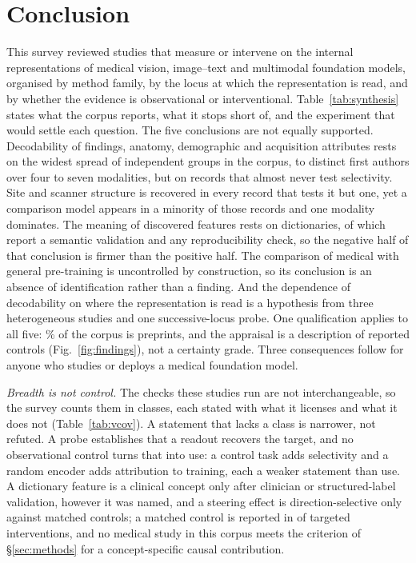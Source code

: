\section{Conclusion}
\label{sec:conclusion}

This survey reviewed \Ncore{} studies that measure or intervene on the internal representations of
medical vision, image--text and multimodal foundation models, organised by method family, by the locus
at which the representation is read, and by whether the evidence is observational or interventional.
Table~\ref{tab:synthesis} states what the corpus reports, what it stops short of, and the experiment
that would settle each question. The five conclusions are not equally supported. Decodability of
findings, anatomy, demographic and acquisition attributes rests on the widest spread of independent
groups in the corpus, \Fdecgrpmin{} to \Fdecgrpmax{} distinct first authors over four to seven
modalities, but on records that almost never test selectivity. Site and scanner structure is recovered
in every record that tests it but one, yet a comparison model appears in a minority of those records
and one modality dominates. The meaning of discovered features rests on \Nsae{} dictionaries, of which
\Nsaeval{} report a semantic validation and \Nsaestab{} any reproducibility check, so the negative half
of that conclusion is firmer than the positive half. The comparison of medical with general
pre-training is uncontrolled by construction, so its conclusion is an absence of identification rather
than a finding. And the dependence of decodability on where the representation is read is a hypothesis
from three heterogeneous studies and one successive-locus probe. One qualification applies to all five:
\Pctpreprint\% of the corpus is preprints, and the appraisal is a description of reported controls
(Fig.~\ref{fig:findings}), not a certainty grade. Three consequences follow for anyone who studies or
deploys a medical foundation model.

\emph{Breadth is not control.} The checks these studies run are not interchangeable, so the survey
counts them in \Vnclasses{} classes, each stated with what it licenses and what it does not
(Table~\ref{tab:vcov}). A statement that lacks a class is narrower, not refuted. A probe establishes
that a readout recovers the target, and no observational control turns that into use: a control task
adds selectivity and a random encoder adds attribution to training, each a weaker statement than use. A
dictionary feature is a clinical concept only after clinician or structured-label validation, however it
was named, and a steering effect is direction-selective only against matched controls; a matched control
is reported in \Vspc{} of \Vspcn{} targeted interventions, and no medical study in this corpus meets the
criterion of \S\ref{sec:methods} for a concept-specific causal contribution.

